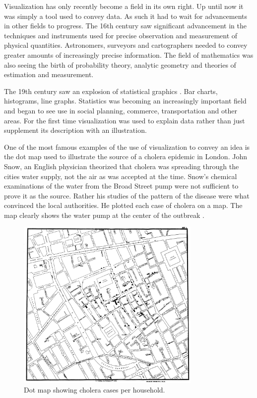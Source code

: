 \documentclass[a4paper, 10pt, titlepage, twocolumn]{article}
\begin{document}
Visualization has only recently become a field in its own right. Up until now it was simply a tool used to convey data. As such it had to wait for advancements in other fields to progress. The 16th century saw significant advancement in the techniques and instruments used for precise observation and measurement of physical quantities. Astronomers, surveyors and cartographers needed to convey greater amounts of increasingly precise information. The field of mathematics was also seeing the birth of probability theory, analytic geometry and theories of estimation and measurement.

The 19th century saw an explosion of statistical graphics \cite{friendly2001milestones}. Bar charts, histograms, line graphs. Statistics was becoming an increasingly important field and began to see use in social planning, commerce, transportation and other areas. For the first time visualization was used to explain data rather than just supplement its description with an illustration.

One of the most famous examples of the use of visualization to convey an idea is the dot map used to illustrate the source of a cholera epidemic in London. John Snow, an English physician theorized that cholera was spreading through the cities water supply, not the air as was accepted at the time. Snow's chemical examinations of the water from the Broad Street pump were not sufficient to prove it as the source. Rather his studies of the pattern of the disease were what convinced the local authorities. He plotted each case of cholera on a map. The map clearly shows the water pump at the center of the outbreak \cite{frerichs2007ghost}.


\begin{figure}[hbt]
  \begin{center}
    \includegraphics[width=3.5in]{snow.jpg}
  \end{center}
  \caption{\small Dot map showing cholera cases per household. }
  \label{f:t}
\end{figure}
\end{document}
